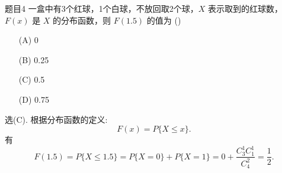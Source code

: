 \begin{question}{题目4}
    一盒中有3个红球，1个白球，不放回取2个球，$X$ 表示取到的红球数，$F(x)$ 是 $X$ 的分布函数，则 $F(1.5)$ 的值为 (\quad \quad)
    \begin{multicols}{4}
        \begin{itemize}
            \item [(A)] 0
            \item [(B)] 0.25
            \item [(C)] 0.5
            \item [(D)] 0.75
        \end{itemize}
    \end{multicols}
\end{question}
\begin{solution}
    选(C).  根据分布函数的定义:
    $$
        F(x) = P\{X \leqslant x\}.
    $$
    有
    $$
        F(1.5) = P\{X \leqslant 1.5\}
        = P\{X=0\} + P\{X=1\}
        = 0 + \frac{C_3^1C_1^1}{C_4^2}
        = \frac{1}{2}.
    $$
\end{solution}

